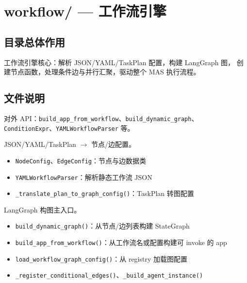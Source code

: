 \section{workflow/ — 工作流引擎}

\subsection{目录总体作用}

工作流引擎核心：解析 JSON/YAML/TaskPlan 配置，构建 LangGraph 图，
创建节点函数，处理条件边与并行汇聚，驱动整个 MAS 执行流程。

\subsection{文件说明}

\begin{description}[leftmargin=4em,style=nextline]
    \item[\texttt{\_\_init\_\_.py}]
    对外 API：\texttt{build\_app\_from\_workflow}、\texttt{build\_dynamic\_graph}、
    \texttt{ConditionExpr}、\texttt{YAMLWorkflowParser} 等。

    \item[\texttt{workflow\_parser.py}]
    JSON/YAML/TaskPlan $\rightarrow$ 节点/边配置。
    \begin{itemize}
        \item \texttt{NodeConfig}、\texttt{EdgeConfig}：节点与边数据类
        \item \texttt{YAMLWorkflowParser}：解析静态工作流 JSON
        \item \texttt{\_translate\_plan\_to\_graph\_config()}：TaskPlan 转图配置
    \end{itemize}

    \item[\texttt{graph\_builder.py}]
    LangGraph 构图主入口。
    \begin{itemize}
        \item \texttt{build\_dynamic\_graph()}：从节点/边列表构建 StateGraph
        \item \texttt{build\_app\_from\_workflow()}：从工作流名或配置构建可 invoke 的 app
        \item \texttt{load\_workflow\_graph\_config()}：从 registry 加载图配置
        \item \texttt{\_register\_conditional\_edges()}、\texttt{\_build\_agent\_instance()}
    \end{itemize}


\end{description}

